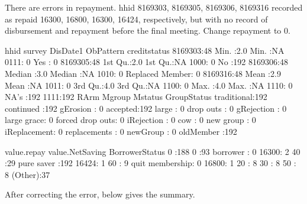 There are errors in repayment. \textsf{hhid} 8169303, 8169305, 8169306, 8169316 recorded as repaid 16300, 16800, 16300, 16424, respectively, but with no record of disbursement and repayment before the final meeting. Change repayment to 0.
\begin{Schunk}
\begin{Soutput}
      hhid        survey       DisDate1   ObPattern           creditstatus
 8169303:48   Min.   :2.0   Min.   :NA    0111:  0   Yes            :  0  
 8169305:48   1st Qu.:2.0   1st Qu.:NA    1000:  0   No             :192  
 8169306:48   Median :3.0   Median :NA    1010:  0   Replaced Member:  0  
 8169316:48   Mean   :2.9   Mean   :NA    1011:  0                        
              3rd Qu.:4.0   3rd Qu.:NA    1100:  0                        
              Max.   :4.0   Max.   :NA    1110:  0                        
                            NA's   :192   1111:192                        
          RArm                  Mgroup            Mstatus      GroupStatus 
 traditional:192   continued       :192   gErosion    :  0   accepted:192  
 large      :  0   drop outs       :  0   gRejection  :  0                 
 large grace:  0   forced drop outs:  0   iRejection  :  0                 
 cow        :  0   new group       :  0   iReplacement:  0                 
                   replacements    :  0   newGroup    :  0                 
                                          oldMember   :192                 
                                                                           
 value.repay value.NetSaving         BorrowerStatus
 0    :188   0      :93      borrower       :  0   
 16300:  2   40     :29      pure saver     :192   
 16424:  1   60     : 9      quit membership:  0   
 16800:  1   20     : 8                            
             30     : 8                            
             50     : 8                            
             (Other):37                            
\end{Soutput}
\end{Schunk}
After correcting the error, below gives the summary.

